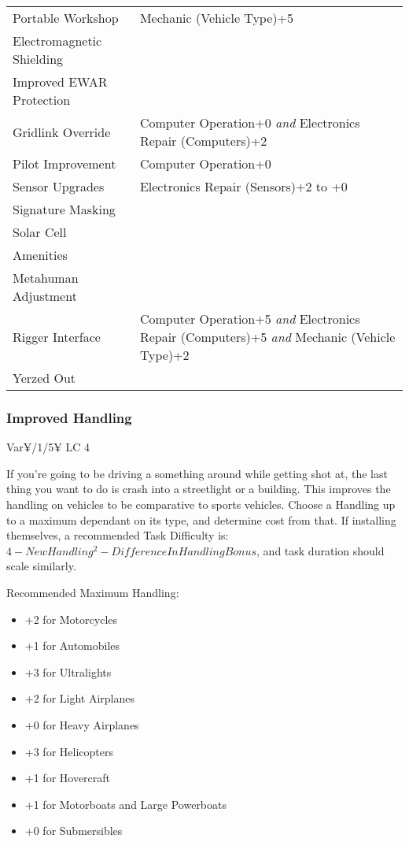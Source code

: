 \begin{multicols*}{2}
\begin{center}
\begin{adjustwidth}{-4mm}{}
{\begin{tabular}{|p{5cm}|p{6.25cm}|}
					Portable Workshop & Mechanic (Vehicle Type)+5 \\
					Electromagnetic Shielding & \\
					Improved EWAR Protection & \\
					Gridlink Override & Computer Operation+0 \textit{and} Electronics Repair (Computers)+2\\
					Pilot Improvement & Computer Operation+0 \\
					Sensor Upgrades & Electronics Repair (Sensors)+2 to +0 \\
					Signature Masking & \\
					Solar Cell & \\
					Amenities & \\
					Metahuman Adjustment & \\
					Rigger Interface & Computer Operation+5 \textit{and} Electronics Repair (Computers)+5 \textit{and} Mechanic (Vehicle Type)+2 \\
					Yerzed Out & \\
					\hline
				\end{tabular}
			}
		\end{adjustwidth}
	\end{center}
	
	

	\subsubsection{Improved Handling}
	Var¥/1/5¥ LC 4
	
	If you're going to be driving a something around while getting shot at, the last thing you want to do is crash into a streetlight or a building. This improves the handling on vehicles to be comparative to sports vehicles. Choose a Handling up to a maximum dependant on its type, and determine cost from that. If installing themselves, a recommended Task Difficulty is: $4 - New Handling^2 - Difference In Handling Bonus$, and task duration should scale similarly.
	
	Recommended Maximum Handling:
	\begin{itemize}
		\itemsep 0pt
		\item +2 for Motorcycles
		\item +1 for Automobiles
		\item +3 for Ultralights
		\item +2 for Light Airplanes
		\item +0 for Heavy Airplanes
		\item +3 for Helicopters
		\item +1 for Hovercraft
		\item +1 for Motorboats and Large Powerboats
		\item +0 for Submersibles
	\end{itemize}
	

\end{multicols*}
